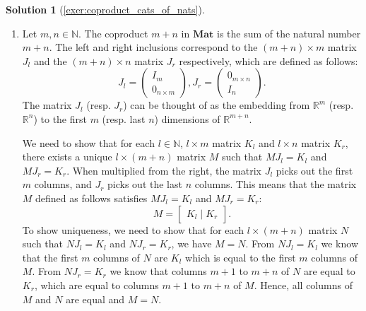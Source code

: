 \documentclass[a4paper,11pt, oneside,titlepage=false]{scrbook}
\theoremstyle{plain}
\theoremstyle{definition}
\newtheorem{solution}[thm]{Solution}
\newcommand{\Catb}[1]{\mathbf{#1}}
\newcommand{\MAT}{\Catb{Mat}}
\newcommand{\NN}{\ensuremath{\mathbb{N}}}
\begin{document}
\begin{solution}[\cref{exer:coproduct_cats_of_nats}]
\begin{enumerate}
		To show uniqueness, we need to show that for each $g : [m+n] \to [l]$ such that $g \circ \iota_l = i_l$ and $g \circ \iota_r = i_r$, we have $f = g$. We show that for each $k \in [m+n]$, $f(k) = g(k)$, which using functional extensionality implies $f = g$.
		Let $k \in [m+n]$. If $k < m$ we have:
		\[ f(k) = i_l(k) = g (\iota_l (k)) = g(k),\]
		and if $m \leq k$ we have:
		\[ f(k) = i_r(k - m) = g (\iota_r (k - m)) = g(k). \]
		Hence, for each $k \in [l]$, $f(k) = g(k)$, and by functional extensionality $f = g$.
		\item Let $m,n \in \NN$. The coproduct $m + n$ in $\MAT$ is the sum of the natural number $m + n$. The left and right inclusions correspond to the $(m+n) \times m$ matrix $J_l$ and the $(m+n) \times n$ matrix $J_r$ respectively, which are defined as follows:
		\[
		J_l =
		\begin{pmatrix}
			I_m \\
			0_{n \times m}
		\end{pmatrix},
		J_r =
		\begin{pmatrix}
			0_{m \times n} \\
			I_n
		\end{pmatrix}.
		\]
		The matrix $J_l$ (resp. $J_r$) can be thought of as the embedding from $\mathbb{R}^{m}$ (resp. $\mathbb{R}^{n}$) to the first $m$ (resp. last $n$) dimensions of $\mathbb{R}^{m+n}$.

		We need to show that for each $l \in \NN$, $l \times m$ matrix $K_l$ and $l \times n$ matrix $K_r$, there exists a unique $l \times (m + n)$ matrix $M$ such that $M J_l = K_l$ and $M J_r = K_r$.
		When multiplied from the right, the matrix $J_l$ picks out the first $m$ columns, and $J_r$ picks out the last $n$ columns. This means that the matrix $M$ defined as follows satisfies $M J_l = K_l$ and $M J_r = K_r$:
		\[
		M =
		\begin{bmatrix}
			K_l \mid K_r
		\end{bmatrix}.
		\]
		To show uniqueness, we need to show that for each $l \times (m+n)$ matrix $N$ such that $N J_l = K_l$ and $N J_r = K_r$, we have $M=N$.
		From $N J_l = K_l$ we know that the first $m$ columns of $N$ are $K_l$ which is equal to the first $m$ columns of $M$. From $N J_r = K_r$ we know that columns $m+1$ to $m+n$ of $N$ are equal to $K_r$, which are equal to columns $m+1$ to $m+n$ of $M$. Hence, all columns of $M$ and $N$ are equal and $M =N$.
	\end{enumerate}
\end{solution}
\end{document}
